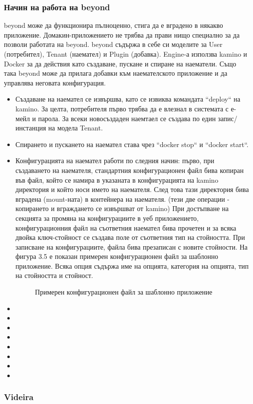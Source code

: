 \documentclass[pdftex,14pt,a4paper]{extreport}
\begin{document}
\subsubsection {Начин на работа на beyond}
beyond може да функционира пълноценно, стига да е вградено в някакво приложение. Домакин-приложението не трябва да прави нищо специално за да позволи работата на beyond. beyond съдържа в себе си моделите за User (потребител), Tenant (наемател) и Plugin (добавка). Engine-а използва kamino и Docker за да действия като създаване, пускане и спиране на наематели. Също така beyond може да прилага добавки към наемателското приложение и да управлява неговата конфигурация.
\begin{itemize}
  \item Създаване на наемател се извършва, като се извиква командата ``deploy`` на kamino. За целта, потребителя първо трябва да е влезнал в системата с е-мейл и парола. За всеки новосъздаден наемтаел се създава по един запис/инстанция на модела Tenant.
  \item Спирането и пускането на наемател става чрез ``docker stop`` и ``docker start``.
  \item Конфигурацията на наемател работи по следния начин: първо, при създаването на наемателя, стандартния конфигурационен файл бива копиран във файл, който се намира в указаната в конфигурацията на kamino директория и който носи името на наемателя. След това тази директория бива вградена (mount-ната) в контейнера на наемателя. (тези две операции - копирането и вграждането се извършват от kamino) При достъпване на секцията за промяна на конфигурациите в уеб приложението, конфигурационния файл на съответния наемател бива прочетен и за всяка двойка ключ-стойност се създава поле от съответния тип на стойността. При записване на конфигурациите, файла бива презаписан с новите стойности. На фигура 3.5 е показан примерен конфигурационен файл за шаблонно приложение. Всяка опция съдържа име на опцията, категория на опцията, тип на стойността и стойност.
  \begin{figure}[h!]
    
    \caption{Примерен конфигурационен файл за шаблонно приложение}
  \end{figure}
  \item
  \item
  \item
  \item
  \item
  \item
  \item
  \item
\end{itemize}
\subsubsection {Videira}
%
%
\end{document}
